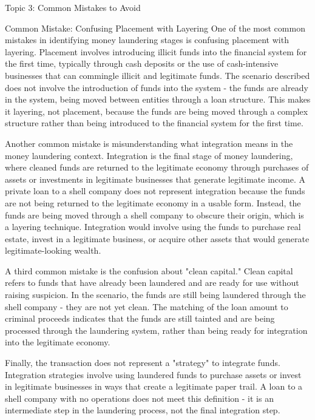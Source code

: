 \documentclass[5pt]{beamer}
\begin{document}
	\begin{frame}{Topic 3: Common Mistakes to Avoid}
		\begin{block}{\tiny Common Mistake: Confusing Placement with Layering}
			\tiny One of the most common mistakes in identifying money laundering stages is confusing placement with layering. Placement involves introducing illicit funds into the financial system for the first time, typically through cash deposits or the use of cash-intensive businesses that can commingle illicit and legitimate funds. The scenario described does not involve the introduction of funds into the system - the funds are already in the system, being moved between entities through a loan structure. This makes it layering, not placement, because the funds are being moved through a complex structure rather than being introduced to the financial system for the first time.
			
			Another common mistake is misunderstanding what integration means in the money laundering context. Integration is the final stage of money laundering, where cleaned funds are returned to the legitimate economy through purchases of assets or investments in legitimate businesses that generate legitimate income. A private loan to a shell company does not represent integration because the funds are not being returned to the legitimate economy in a usable form. Instead, the funds are being moved through a shell company to obscure their origin, which is a layering technique. Integration would involve using the funds to purchase real estate, invest in a legitimate business, or acquire other assets that would generate legitimate-looking wealth.
			
			A third common mistake is the confusion about "clean capital." Clean capital refers to funds that have already been laundered and are ready for use without raising suspicion. In the scenario, the funds are still being laundered through the shell company - they are not yet clean. The matching of the loan amount to criminal proceeds indicates that the funds are still tainted and are being processed through the laundering system, rather than being ready for integration into the legitimate economy.
			
			Finally, the transaction does not represent a "strategy" to integrate funds. Integration strategies involve using laundered funds to purchase assets or invest in legitimate businesses in ways that create a legitimate paper trail. A loan to a shell company with no operations does not meet this definition - it is an intermediate step in the laundering process, not the final integration step.
		\end{block}
	\end{frame}
	
\end{document}
